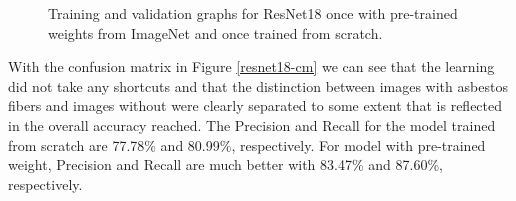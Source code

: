 \begin{figure}[h]
\centering
{}
\caption{Training and validation graphs for ResNet18 once with pre-trained weights from ImageNet and once trained from scratch.}
\label{fig:resnet18-graph}
\end{figure}

With the confusion matrix in Figure \ref{resnet18-cm} we can see that the learning did not take any shortcuts and that the distinction between images with asbestos fibers and images without were clearly separated to some extent that is reflected in the overall accuracy reached. The Precision and Recall for the model trained from scratch are 77.78\% and 80.99\%, respectively. For model with pre-trained weight, Precision and Recall are much better with 83.47\% and 87.60\%, respectively.

